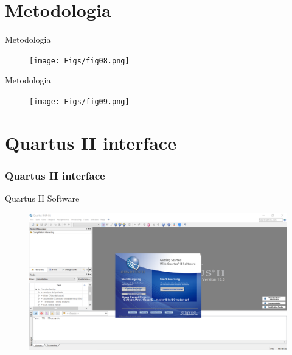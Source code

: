 \documentclass{CPSPresentation}
\begin{document}
\section{Metodologia}
\begin{frame}{Metodologia}
	\justifying
	
	\begin{figure}[h]
		\centering
		\texttt{[image: Figs/fig08.png]}
	\end{figure}
	
	
\end{frame}
\begin{frame}{Metodologia}
	\justifying
	
	\begin{figure}[h]
		\centering
		\texttt{[image: Figs/fig09.png]}
	\end{figure}
	
	
\end{frame}
\section{Quartus II interface}
\begin{frame}
	\frametitle{Quartus II interface}
	
	\begin{block}{}
		\justifying
		Quartus II Software
	\end{block}
	
	
	
	\begin{figure}[h]
		\centering
		\includegraphics[width=1.01\textwidth]{quartus/fig02.pdf}
	\end{figure}
	
	
\end{frame}
\end{document}
